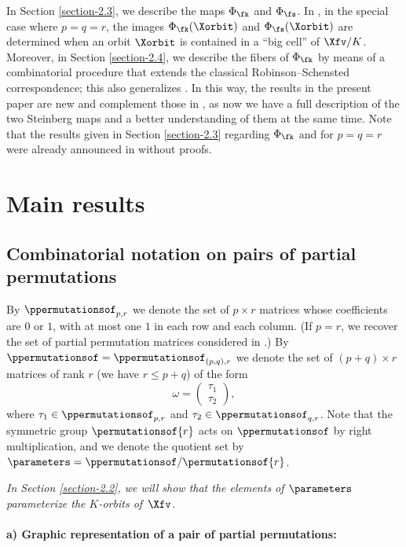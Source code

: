 In Section \ref{section-2.3}, we describe the maps $\Phi_\fk$ and $\Phi_\fs$. In \cite{FN2}, in the special case where $p=q=r$,
the images $\Phi_\fk(\Xorbit)$ and $\Phi_\fs(\Xorbit)$ are determined when an orbit $\Xorbit$ is contained in a ``big cell'' of $\Xfv/K$.
Moreover, in Section \ref{section-2.4}, we describe the fibers of $\Phi_\fk$ by means of a combinatorial procedure that extends the classical Robinson--Schensted correspondence; this also generalizes \cite[Theorem 7.8]{FN2}.
In this way, the results in the present paper are new and complement those in \cite{FN2}, as now we have a full description of the two Steinberg maps and a better understanding of them at the same time. Note that the results given in Section \ref{section-2.3} regarding $\Phi_\fk$ and for $p=q=r$ were already announced in \cite[\S 2]{FN3} without proofs.




\section{Main results}

\subsection{Combinatorial notation on pairs of partial permutations}

\label{section-2.1}

By $\ppermutationsof_{p,r}$ we denote the set of $p\times r$ matrices whose coefficients are $0$ or $1$, with at most one $1$ in each row and each column.
(If $p=r$, we recover the set of partial permutation matrices considered in \cite{FN2}.)
By $\ppermutationsof=\ppermutationsof_{(p,q),r}$ we denote the set of $(p+q)\times r$ matrices of rank $r$ (we have $r\leq p+q$) of the form
\[\omega=\begin{pmatrix} \tau_1\\ \tau_2 \end{pmatrix},\]
where $\tau_1\in\ppermutationsof_{p,r}$ and $\tau_2\in\ppermutationsof_{q,r}$.
Note that the symmetric group $\permutationsof{r}$ acts on $\ppermutationsof$ by right multiplication, and we denote the quotient set by $\parameters=\ppermutationsof/\permutationsof{r}$.

{\em In Section \ref{section-2.2}, we will show that the elements of $\parameters$ parameterize the $K$-orbits of~$\Xfv$.}


\paragraph{\bf a) Graphic representation of a pair of partial permutations:}\

